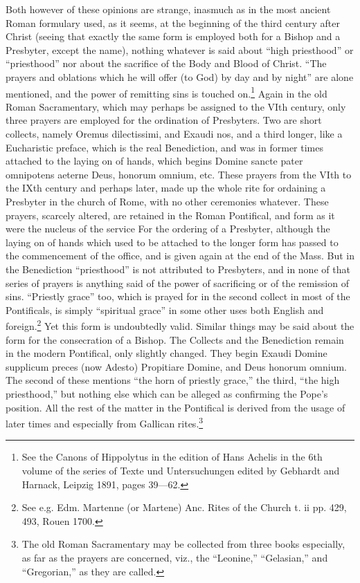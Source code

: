 Both however of these opinions are strange, inasmuch as in the most ancient Roman formulary used, as it seems, at the beginning of the third century after Christ (seeing that exactly the same form is employed both for a Bishop and a Presbyter, except the name), nothing whatever is said about “high priesthood” or “priesthood” nor about the sacrifice of the Body and Blood of Christ. “The prayers and oblations which he will offer (to God) by day and by night” are alone mentioned, and the power of remitting sins is touched on.\footnote{See the Canons of Hippolytus in the edition of Hans Achelis in the 6th volume of the series of Texte und Untersuchungen edited by Gebhardt and Harnack, Leipzig 1891, pages 39—62.} Again in the old Roman Sacramentary, which may perhaps be assigned to the VIth century, only three prayers are employed for the ordination of Presbyters. Two are short collects, namely Oremus dilectissimi, and Exaudi nos, and a third longer, like a Eucharistic preface, which is the real Benediction, and was in former times attached to the laying on of hands, which begins Domine sancte pater omnipotens aeterne Deus, honorum omnium, etc. These prayers from the VIth to the IXth century and perhaps later, made up the whole rite for ordaining a Presbyter in the church of Rome, with no other ceremonies whatever. These prayers, scarcely altered, are retained in the Roman Pontifical, and form as it were the nucleus of the service For the ordering of a Presbyter, although the laying on of hands which used to be attached to the longer form has passed to the commencement of the office, and is given again at the end of the Mass. But in the Benediction “priesthood” is not attributed to Presbyters, and in none of that series of prayers is anything said of the power of sacrificing or of the remission of sins. “Priestly grace” too, which is prayed for in the second collect in most of the Pontificals, is simply “spiritual grace” in some other uses both English and foreign.\footnote{See e.g. Edm. Martenne (or Martene) Anc. Rites of the Church t. ii pp. 429, 493, Rouen 1700.} Yet this form is undoubtedly valid. Similar things may be said about the form for the consecration of a Bishop. The Collects and the Benediction remain in the modern Pontifical, only slightly changed. They begin Exaudi Domine supplicum preces (now Adesto) Propitiare Domine, and Deus honorum omnium. The second of these mentions “the horn of priestly grace,” the third, “the high priesthood,” but nothing else which can be alleged as confirming the Pope’s position. All the rest of the matter in the Pontifical is derived from the usage of later times and especially from Gallican rites.\footnote{The old Roman Sacramentary may be collected from three books especially, as far as the prayers are concerned, viz., the “Leonine,” “Gelasian,” and “Gregorian,” as they are called.}

